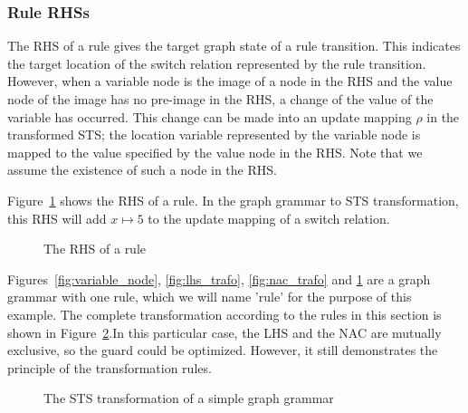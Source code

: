 \subsubsection{Rule RHSs}
The RHS of a rule gives the target graph state of a rule transition. This indicates the target location of the switch relation represented by the rule transition. However, when a variable node is the image of a node in the RHS and the value node of the image has no pre-image in the RHS, a change of the value of the variable has occurred. This change can be made into an update mapping $\rho$ in the transformed STS; the location variable represented by the variable node is mapped to the value specified by the value node in the RHS. Note that we assume the existence of such a node in the RHS.

Figure~\ref{fig:rhs_trafo} shows the RHS of a rule. In the graph grammar to STS transformation, this RHS will add $x \mapsto 5$ to the update mapping of a switch relation.

\begin{figure}[ht]
  \begin{center}
    
  \end{center}
  \caption{The RHS of a rule}
  \label{fig:rhs_trafo}
\end{figure}

Figures~\ref{fig:variable_node}, \ref{fig:lhs_trafo}, \ref{fig:nac_trafo} and \ref{fig:rhs_trafo} are a graph grammar with one rule, which we will name 'rule' for the purpose of this example. The complete transformation according to the rules in this section is shown in Figure~\ref{fig:sts_trafo}.In this particular case, the LHS and the NAC are mutually exclusive, so the guard could be optimized. However, it still demonstrates the principle of the transformation rules.

 \begin{figure}[ht]
  \begin{center}
    
  \end{center}
  \caption{The STS transformation of a simple graph grammar}
  \label{fig:sts_trafo}
\end{figure}
